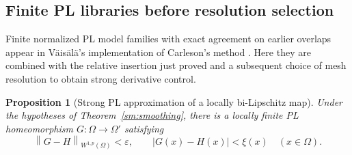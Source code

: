\documentclass[11pt]{article}
\numberwithin{equation}{section}
\newtheorem{proposition}[theorem]{Proposition}
\theoremstyle{definition}
\theoremstyle{remark}
\newcommand{\eps}{\varepsilon}
\newcommand{\norm}[1]{\left\lVert #1\right\rVert}
\begin{document}
\subsection{Finite PL libraries before resolution selection}

Finite normalized PL model families with exact agreement on earlier
overlaps appear in V\"ais\"al\"a's implementation of Carleson's method
\cite[Sections~1.2 and~2.7--2.11]{Vaisala1977}. Here they are combined
with the relative insertion just proved and a subsequent choice of mesh
resolution to obtain strong derivative control.

\begin{proposition}[Strong PL approximation of a locally bi-Lipschitz map]
\label{sm:bilip-pl}
Under the hypotheses of Theorem~\ref{sm:smoothing}, there is a
locally finite PL homeomorphism $G:\Omega\to\Omega'$ satisfying
\[
 \norm{G-H}_{W^{1,p}(\Omega)}<\eps,
 \qquad |G(x)-H(x)|<\xi(x)\quad(x\in\Omega).
\]
\end{proposition}
\end{document}
